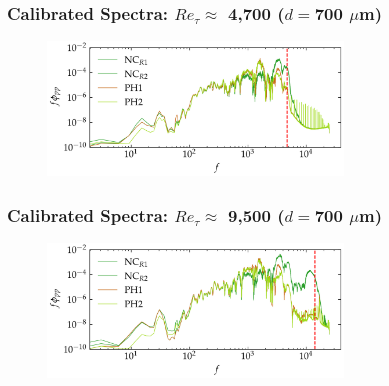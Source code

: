 \documentclass[aspectratio=169,9pt]{beamer}
\begin{document}
\begin{frame}
  \frametitle{Calibrated Spectra: $Re_\tau \approx$ 4,700 ($d=$700 $\mu$m)}
  \begin{figure}
    \centering
    \includegraphics[width=0.7\textwidth]{tf_calib/700_50psi_calib_spec_a2.png}
  \end{figure}
\end{frame}

\begin{frame}
  \frametitle{Calibrated Spectra: $Re_\tau \approx$ 9,500 ($d=$700 $\mu$m)}
  \begin{figure}
    \centering
    \includegraphics[width=0.7\textwidth]{tf_calib/700_100psi_calib_spec_a2.png}
  \end{figure}
\end{frame}
\end{document}
